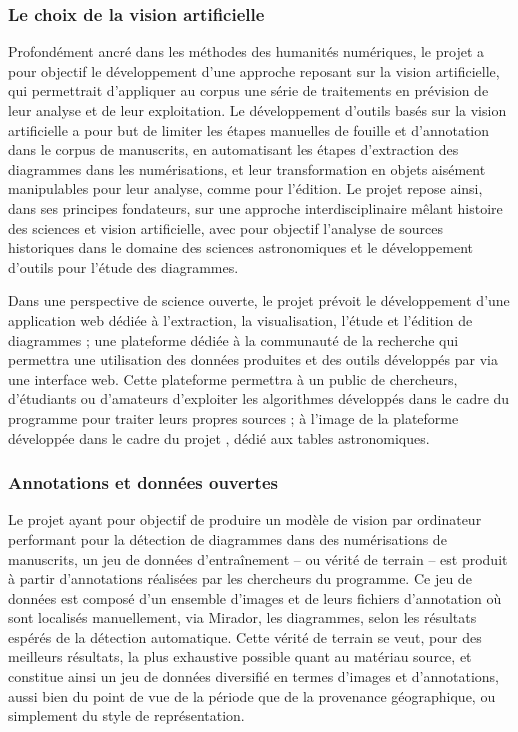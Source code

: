     \subsubsection{Le choix de la vision artificielle}
	Profondément ancré dans les méthodes des humanités numériques, le projet \eida a pour objectif le développement d’une approche reposant sur la vision artificielle, qui permettrait d’appliquer au corpus une série de traitements en prévision de leur analyse et de leur exploitation. Le développement d’outils basés sur la vision artificielle a pour but de limiter les étapes manuelles de fouille et d’annotation dans le corpus de manuscrits, en automatisant les étapes d’extraction des diagrammes dans les numérisations, et leur transformation en objets aisément manipulables pour leur analyse, comme pour l’édition. Le projet \eida repose ainsi, dans ses principes fondateurs, sur une approche interdisciplinaire mêlant histoire des sciences et vision artificielle, avec pour objectif l’analyse de sources historiques dans le domaine des sciences astronomiques et le développement d’outils pour l’étude des diagrammes.
	
	Dans une perspective de science ouverte, le projet \eida prévoit le développement d’une application web dédiée à l’extraction, la visualisation, l’étude et l’édition de diagrammes ; une plateforme dédiée à la communauté de la recherche qui permettra une utilisation des données produites et des outils développés par \eida via une interface web. Cette plateforme permettra à un public de chercheurs, d’étudiants ou d’amateurs d’exploiter les algorithmes développés dans le cadre du programme pour traiter leurs propres sources ; à l'image de la plateforme développée dans le cadre du projet \dishas, dédié aux tables astronomiques. 

    \subsubsection{Annotations et données ouvertes}
	Le projet \eida ayant pour objectif de produire un modèle de vision par ordinateur performant pour la détection de diagrammes dans des numérisations de manuscrits, un jeu de données d'entraînement -- ou vérité de terrain -- est produit à partir d'annotations réalisées par les chercheurs du programme. Ce jeu de données est composé d'un ensemble d'images et de leurs fichiers d'annotation où sont localisés manuellement, via Mirador, les diagrammes, selon les résultats espérés de la détection automatique. Cette vérité de terrain se veut, pour des meilleurs résultats, la plus exhaustive possible quant au matériau source, et constitue ainsi un jeu de données diversifié en termes d'images et d'annotations, aussi bien du point de vue de la période que de la provenance géographique, ou simplement du style de représentation. 
	
